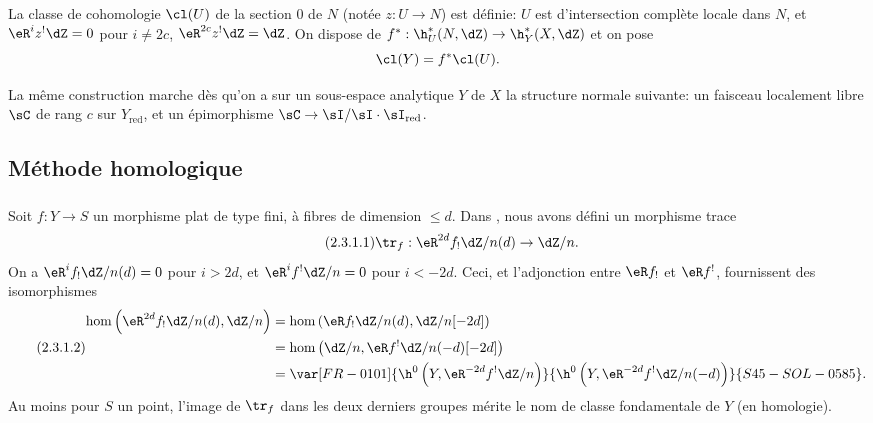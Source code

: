 La classe de cohomologie $\cl(U)$ de la section $0$ de $N$ (notée $z:U\to N$) 
est définie: $U$ est d'intersection complète locale dans $N$, et 
$\eR^i z^!\dZ = 0$ pour $i\ne 2 c$, $\eR^{2 c} z^!\dZ = \dZ$. On dispose de 
$f^*:\h_U^*(N,\dZ) \to \h_Y^*(X,\dZ)$ et on pose 
\[
  \cl(Y) = f^*\cl(U) \text{.}
\]

La même construction marche dès qu'on a sur un sous-espace analytique $Y$ 
de $X$ la structure normale suivante: un faisceau localement libre $\sC$ de 
rang $c$ sur $Y_\text{red}$, et un épimorphisme 
$\sC\to \sI/\sI\cdot \sI_\text{red}$. 










\subsection{Méthode homologique}\label{IV:2-3}





\subsubsection{}\label{IV:2-3-1}

Soit $f:Y\to S$ un morphisme plat de type fini, à fibres de dimension 
$\leqslant d$. Dans , nous avons défini un morphisme 
trace 
\begin{equation*}\tag{2.3.1.1}\label{IV:eq:2-3-1-1}
  \tr_f:\eR^{2 d} f_! \dZ/n(d) \to \dZ/n \text{.}
\end{equation*}
On a $\eR^i f_!\dZ/n(d)=0$ pour $i>2 d$, et $\eR^i f^!\dZ/n=0$ pour $i<-2 d$. 
Ceci, et l'adjonction entre $\eR f_!$ et $\eR f^!$, fournissent des isomorphismes 
\begin{equation*}\tag{2.3.1.2}\label{IV:eq:2-3-1-2}
\begin{aligned}
  \hom\left(\eR^{2 d}f_!\dZ/n(d),\dZ/n\right) 
    &= \hom\left(\eR f_!\dZ/n(d),\dZ/n[-2 d]\right) \\
    &= \hom\left(\dZ/n,\eR f^!\dZ/n(-d)[-2 d]\right) \\
    &= \var[FR-0101]{\h^0\left(Y,\eR^{-2 d}f^!\dZ/n\right)}{\h^0\left(Y,\eR^{-2 d}f^!\dZ/n(-d)\right)}{S45-SOL-0585} \text{.}
\end{aligned}
\end{equation*}
Au moins pour $S$ un point, l'image de $\tr_f$ dans les deux derniers groupes 
mérite le nom de classe fondamentale de $Y$ (en homologie). 

